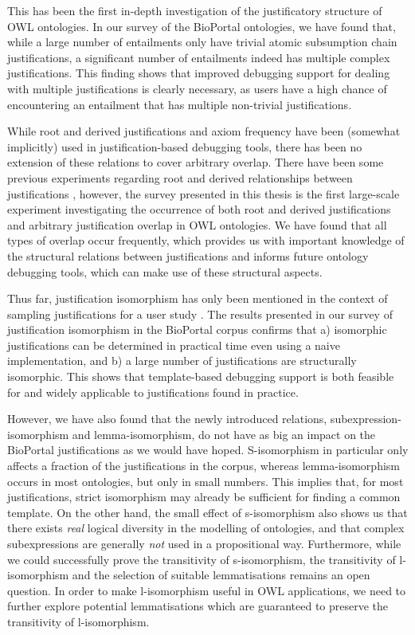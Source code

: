 This has been the first in-depth investigation of the justificatory structure of OWL ontologies. In our survey of the BioPortal ontologies, we have found that, while a large number of entailments only have trivial atomic subsumption chain justifications, a significant number of entailments indeed has multiple complex justifications. This finding shows that improved debugging support for dealing with multiple justifications is clearly necessary, as users have a high chance of encountering an entailment that has multiple non-trivial justifications.

While root and derived justifications and axiom frequency have been (somewhat implicitly) used in justification-based debugging tools, there has been no extension of these relations to cover arbitrary overlap. There have been some previous experiments regarding root and derived relationships between justifications \cite{kalyanpur05mi,meyer10vd}, however, the survey presented in this thesis is the first large-scale experiment investigating the occurrence of both root and derived justifications and arbitrary justification overlap in OWL ontologies. We have found that all types of overlap occur frequently, which provides us with important knowledge of the structural relations between justifications and informs future ontology debugging tools, which can make use of these structural aspects.

Thus far, justification isomorphism has only been mentioned in the context of sampling justifications for a user study \cite{horridge11gj}. The results presented in our survey of justification isomorphism in the BioPortal corpus confirms that a) isomorphic justifications can be determined in practical time even using a naive implementation, and b) a large number of justifications are structurally isomorphic. This shows that template-based debugging support is both feasible for and widely applicable to justifications found in practice.

However, we have also found that the newly introduced relations, subexpression-isomorphism and lemma-isomorphism, do not have as big an impact on the BioPortal justifications as we would have hoped. S-isomorphism in particular only affects a fraction of the justifications in the corpus, whereas lemma-isomorphism occurs in most ontologies, but only in small numbers. This implies that, for most justifications, strict isomorphism may already be sufficient for finding a common template. On the other hand, the small effect of s-isomorphism also shows us that there exists \emph{real} logical diversity in the modelling of ontologies, and that complex subexpressions are generally \emph{not} used in a propositional way. Furthermore, while we could successfully prove the transitivity of s-isomorphism, the transitivity of l-isomorphism and the selection of suitable lemmatisations remains an open question. In order to make l-isomorphism useful in OWL applications, we need to further explore potential lemmatisations which are guaranteed to preserve the transitivity of l-isomorphism.

